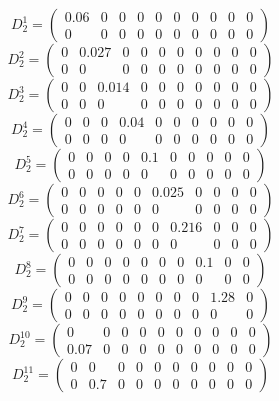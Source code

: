 \documentclass[a4paper,12pt]{article}
\begin{document}
\[
D^1_2 = \begin{pmatrix}
    0.06 & 0 & 0 & 0 & 0 & 0 & 0 & 0 & 0 & 0 \\
    0 & 0 & 0 & 0 & 0 & 0 & 0 & 0 & 0 & 0
\end{pmatrix}
\]
\[
D^2_2 = \begin{pmatrix}
    0 & 0.027 & 0 & 0 & 0 & 0 & 0 & 0 & 0 & 0 \\
    0 & 0 & 0 & 0 & 0 & 0 & 0 & 0 & 0 & 0
\end{pmatrix}
\]
\[
D^3_2 = \begin{pmatrix}
    0 & 0 & 0.014 & 0 & 0 & 0 & 0 & 0 & 0 & 0 \\
    0 & 0 & 0 & 0 & 0 & 0 & 0 & 0 & 0 & 0
\end{pmatrix}
\]
\[
D^4_2 = \begin{pmatrix}
    0 & 0 & 0 & 0.04 & 0 & 0 & 0 & 0 & 0 & 0 \\
    0 & 0 & 0 & 0 & 0 & 0 & 0 & 0 & 0 & 0
\end{pmatrix}
\]
\[
D^5_2 = \begin{pmatrix}
    0 & 0 & 0 & 0 & 0.1 & 0 & 0 & 0 & 0 & 0 \\
    0 & 0 & 0 & 0 & 0 & 0 & 0 & 0 & 0 & 0
\end{pmatrix}
\]
\[
D^6_2 = \begin{pmatrix}
    0 & 0 & 0 & 0 & 0 & 0.025 & 0 & 0 & 0 & 0 \\
    0 & 0 & 0 & 0 & 0 & 0 & 0 & 0 & 0 & 0
\end{pmatrix}
\]
\[
D^7_2 = \begin{pmatrix}
    0 & 0 & 0 & 0 & 0 & 0 & 0.216 & 0 & 0 & 0 \\
    0 & 0 & 0 & 0 & 0 & 0 & 0 & 0 & 0 & 0
\end{pmatrix}
\]
\[
D^8_2 = \begin{pmatrix}
    0 & 0 & 0 & 0 & 0 & 0 & 0 & 0.1 & 0 & 0 \\
    0 & 0 & 0 & 0 & 0 & 0 & 0 & 0 & 0 & 0
\end{pmatrix}
\]
\[
D^9_2 = \begin{pmatrix}
    0 & 0 & 0 & 0 & 0 & 0 & 0 & 0 & 1.28 & 0 \\
    0 & 0 & 0 & 0 & 0 & 0 & 0 & 0 & 0 & 0
\end{pmatrix}
\]
\[
D^{10}_2 = \begin{pmatrix}
    0 & 0 & 0 & 0 & 0 & 0 & 0 & 0 & 0 & 0 \\
    0.07 & 0 & 0 & 0 & 0 & 0 & 0 & 0 & 0 & 0
\end{pmatrix}
\]
\[
D^{11}_2 = \begin{pmatrix}
    0 & 0 & 0 & 0 & 0 & 0 & 0 & 0 & 0 & 0 \\
    0 & 0.7 & 0 & 0 & 0 & 0 & 0 & 0 & 0 & 0
\end{pmatrix}
\]
\end{document}
